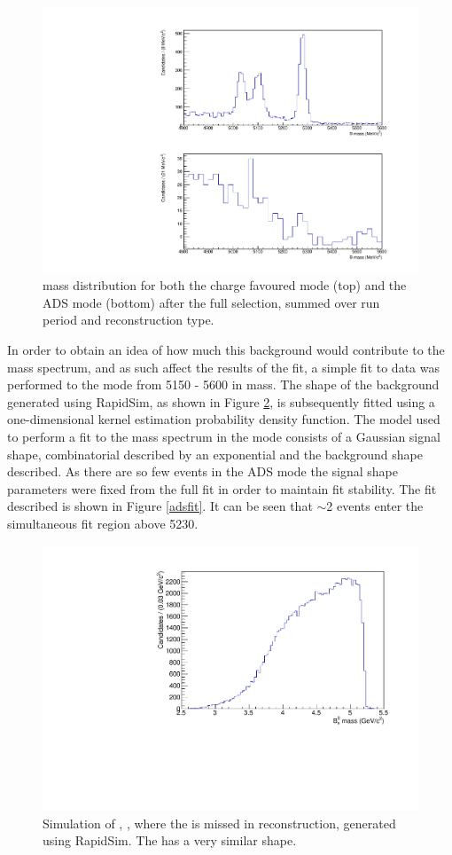 \begin{figure}
\centering
\includegraphics[width=0.6\linewidth]{figures/backgrounds/adsfullrange.pdf}
\caption{\B mass distribution for both the charge favoured \kpi mode (top) and the ADS mode (bottom) after the full selection, summed over run period and \KS reconstruction type.}
\label{adsfullrange}
\end{figure}

In order to obtain an idea of how much this \Bs background would contribute to the \Bm mass spectrum, and as such affect the results of the fit, a simple fit to data was performed to the \pik mode from 5150 - 5600 \mev in \Bm mass. The shape of the \Bs background generated using RapidSim, as shown in Figure \ref{Bsshape}, is subsequently fitted using a one-dimensional kernel estimation probability density function. The model used to perform a fit to the \Bm mass spectrum in the \pik mode consists of a Gaussian signal shape, combinatorial described by an exponential and the \Bs background shape described. As there are so few events in the ADS mode the signal shape parameters were fixed from the full fit in order to maintain fit stability. The fit described is shown in Figure \ref{adsfit}. It can be seen that $\sim$2 \Bs events enter the simultaneous fit region above 5230\mev.

\begin{figure}
\centering
\includegraphics[width=0.5\linewidth]{figures/backgrounds/BsShape.pdf}
\caption{Simulation of , , where the \pip is missed in reconstruction, generated using RapidSim. The  has a very similar shape.}
\label{Bsshape}
\end{figure}

